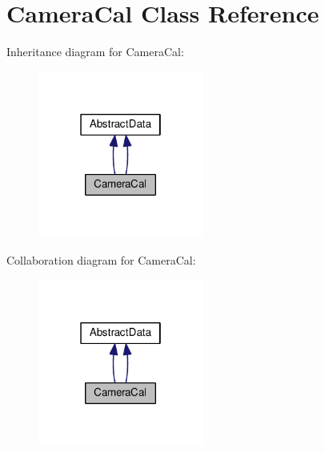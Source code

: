 \hypertarget{classCameraCal}{}\section{Camera\+Cal Class Reference}
\label{classCameraCal}


Inheritance diagram for Camera\+Cal\+:\nopagebreak
\begin{figure}[H]
\begin{center}
\leavevmode
\includegraphics[width=154pt]{classCameraCal__inherit__graph}
\end{center}
\end{figure}


Collaboration diagram for Camera\+Cal\+:\nopagebreak
\begin{figure}[H]
\begin{center}
\leavevmode
\includegraphics[width=154pt]{classCameraCal__coll__graph}
\end{center}
\end{figure}
